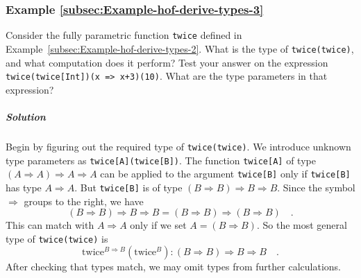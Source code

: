 \subsubsection{Example \label{subsec:Example-hof-derive-types-3}\ref{subsec:Example-hof-derive-types-3}}

Consider the fully parametric function \lstinline!twice! defined
in Example~\ref{subsec:Example-hof-derive-types-2}. What is the
type of \lstinline!twice(twice)!, and what computation does it perform?
Test your answer on the expression \lstinline!twice(twice[Int])(x => x+3)(10)!.
What are the type parameters in that expression?

\subparagraph{Solution}

Begin by figuring out the required type of \lstinline!twice(twice)!.
We introduce unknown type parameters as \lstinline!twice[A](twice[B])!.
The function \lstinline!twice[A]! of type $\left(A\Rightarrow A\right)\Rightarrow A\Rightarrow A$
can be applied to the argument \lstinline!twice[B]! only if \lstinline!twice[B]!
has type $A\Rightarrow A$. But \lstinline!twice[B]! is of type $\left(B\Rightarrow B\right)\Rightarrow B\Rightarrow B$.
Since the symbol $\Rightarrow$ groups to the right, we have 
\[
\left(B\Rightarrow B\right)\Rightarrow B\Rightarrow B=\left(B\Rightarrow B\right)\Rightarrow\left(B\Rightarrow B\right)\quad.
\]
This can match with $A\Rightarrow A$ only if we set $A=\left(B\Rightarrow B\right)$.
So the most general type of \lstinline!twice(twice)! is
\begin{equation}
\text{twice}^{B\Rightarrow B}(\text{twice}^{B}):\left(B\Rightarrow B\right)\Rightarrow B\Rightarrow B\quad.\label{eq:hof-twice-example-solved3}
\end{equation}
After checking that types match, we may omit types from further calculations.

